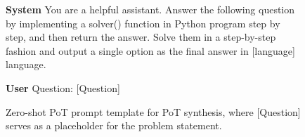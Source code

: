 


\begin{figure}[h]
    \small
    \centering
    \begin{mdframed}
    \textbf{System} \newline
    You are a helpful assistant. Answer the following question
    by implementing a solver() function in Python program
    step by step, and then return the answer.
    \newline
    Solve them in a step-by-step fashion and output a single option as the final answer in [language] language.
    \end{mdframed}
    \begin{mdframed}
    \textbf{User} \newline
    Question: [Question]
    \end{mdframed}    
    \caption{
    Zero-shot PoT prompt template for PoT synthesis, where [Question] serves as a placeholder for the problem statement.
    }
    \label{fig:zs-prompt}
\end{figure}



